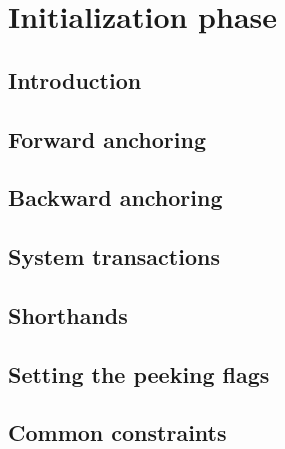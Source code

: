 

\section{Initialization phase         \lispTodo{}}
\subsection{Introduction              \lispNone{}}   \label{hub: initialization phase: introduction}             
\subsection{Forward  anchoring        \lispTodo{}}   \label{hub: initialization phase: anchoring forward}        
\subsection{Backward anchoring        \lispTodo{}}   \label{hub: initialization phase: anchoring backward}       
\subsection{System transactions       \lispTodo{}}   \label{hub: initialization phase: system transactions}      
\subsection{Shorthands                \lispTodo{}}   \label{hub: initialization phase: shorthands}               
\subsection{Setting the peeking flags \lispTodo{}}   \label{hub: initialization phase: setting peeking flags}    
\subsection{Common constraints        \lispTodo{}}   \label{hub: initialization phase: common constraints}       
